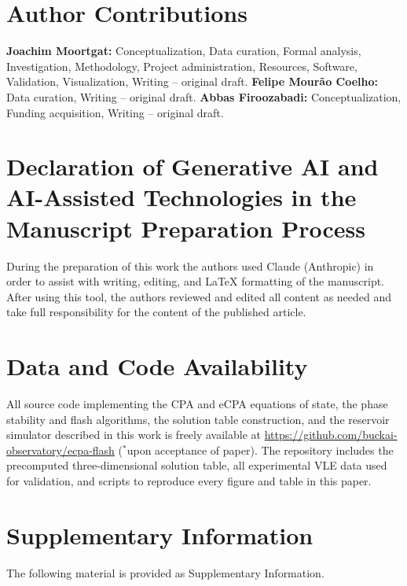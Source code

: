 \documentclass[preprint,12pt,number]{elsarticle}
\begin{document}
\section*{Author Contributions}

\textbf{Joachim Moortgat:} Conceptualization, Data curation, Formal analysis,
Investigation, Methodology, Project administration, Resources, Software,
Validation, Visualization, Writing -- original draft.
\textbf{Felipe Mour\~{a}o Coelho:} Data curation, Writing -- original draft.
\textbf{Abbas Firoozabadi:} Conceptualization, Funding acquisition, Writing -- original draft.

\section*{Declaration of Generative AI and AI-Assisted Technologies in the
Manuscript Preparation Process}

During the preparation of this work the authors used Claude (Anthropic) in order
to assist with writing, editing, and LaTeX formatting of the manuscript.
After using this tool, the authors reviewed and edited all content as needed
and take full responsibility for the content of the published article.

\section*{Data and Code Availability}

All source code implementing the CPA and eCPA equations of state,
the phase stability and flash algorithms, the solution table construction,
and the reservoir simulator described in this work is freely available at
\url{https://github.com/buckai-observatory/ecpa-flash} ($^\ast$upon acceptance of paper).
The repository includes the precomputed three-dimensional solution table,
all experimental VLE data used for validation, and scripts to reproduce
every figure and table in this paper.

\section*{Supplementary Information}

The following material is provided as Supplementary Information.
\end{document}
